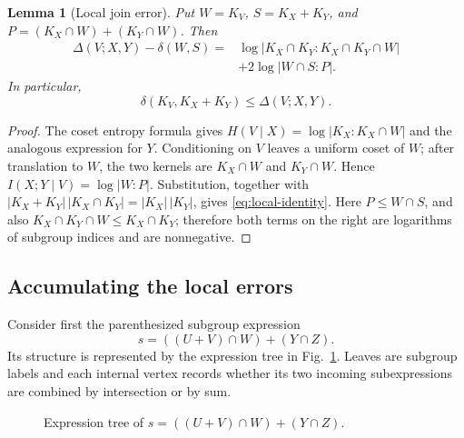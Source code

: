 \documentclass[journal]{IEEEtran}
\newtheorem{lemma}[theorem]{Lemma}
\begin{document}
\begin{lemma}[Local join error]\label{lem:local-defect}
Put $W=K_V$, $S=K_X+K_Y$, and
$P=(K_X\cap W)+(K_Y\cap W)$.  Then
\begin{equation}\label{eq:local-identity}
\begin{aligned}
 \Delta(V;X,Y)-\delta(W,S)
  ={}&\log|K_X\cap K_Y:K_X\cap K_Y\cap W|\\
    &+2\log|W\cap S:P|.
\end{aligned}
\end{equation}
In particular,
\[
   \delta(K_V,K_X+K_Y)\le \Delta(V;X,Y).
\]
\end{lemma}
\begin{proof}
The coset entropy formula gives
$H(V\mid X)=\log|K_X:K_X\cap W|$ and the analogous expression for $Y$.
Conditioning on $V$ leaves a uniform coset of $W$; after translation to $W$,
the two kernels are $K_X\cap W$ and $K_Y\cap W$.  Hence
$I(X;Y\mid V)=\log|W:P|$.  Substitution, together with
$|K_X+K_Y|\,|K_X\cap K_Y|=|K_X|\,|K_Y|$, gives
\eqref{eq:local-identity}.  Here $P\le W\cap S$, and also $K_X\cap K_Y\cap W\le K_X\cap K_Y$;
therefore both terms on the right are logarithms of subgroup indices and are
nonnegative.
\end{proof}

\subsection{Accumulating the local errors}\label{sec:accumulating}
Consider first the parenthesized subgroup expression
\[
  s=((U+V)\cap W)+(Y\cap Z).
\]
Its structure is represented by the expression tree in
Fig.~\ref{fig:expression-tree}.  Leaves are subgroup labels and each internal
vertex records whether its two incoming subexpressions are combined by
intersection or by sum.

\begin{figure}[!t]
\centering
{}
\caption{Expression tree of $s=((U+V)\cap W)+(Y\cap Z)$.}
\label{fig:expression-tree}
\end{figure}
\end{document}
